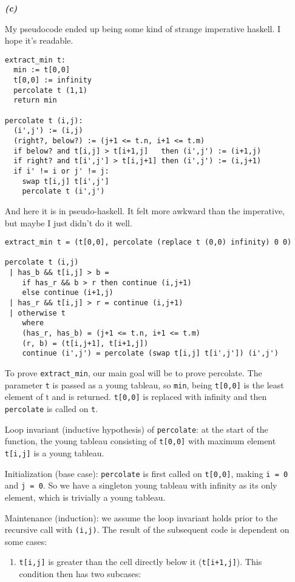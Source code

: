 \documentclass{article}
\begin{document}
\begin{enumerate}
\begin{enumerate}
		\item[\textbf{\emph{{(c)}}}]

My pseudocode ended up being some kind of strange imperative haskell. I hope
it's readable.

\begin{verbatim}
extract_min t:
  min := t[0,0]
  t[0,0] := infinity
  percolate t (1,1)
  return min

percolate t (i,j):
  (i',j') := (i,j)
  (right?, below?) := (j+1 <= t.n, i+1 <= t.m)
  if below? and t[i,j] > t[i+1,j]   then (i',j') := (i+1,j)
  if right? and t[i',j'] > t[i,j+1] then (i',j') := (i,j+1)
  if i' != i or j' != j:
    swap t[i,j] t[i',j']
    percolate t (i',j')
\end{verbatim}

And here it is in pseudo-haskell. It felt more awkward than the
imperative, but maybe I just didn't do it well.

\begin{minipage}{\linewidth}
\begin{verbatim}
extract_min t = (t[0,0], percolate (replace t (0,0) infinity) 0 0)

percolate t (i,j) 
 | has_b && t[i,j] > b =
    if has_r && b > r then continue (i,j+1)
    else continue (i+1,j)
 | has_r && t[i,j] > r = continue (i,j+1) 
 | otherwise t
    where
    (has_r, has_b) = (j+1 <= t.n, i+1 <= t.m)
    (r, b) = (t[i,j+1], t[i+1,j])
    continue (i',j') = percolate (swap t[i,j] t[i',j']) (i',j')

\end{verbatim}
\end{minipage}

To prove \texttt{extract\_min}, our main goal will be to prove percolate. The parameter
\texttt{t} is passed as a young tableau, so \texttt{min}, being \texttt{t[0,0]}
is the least element of t and is returned. \texttt{t[0,0]} is replaced with
infinity and then \texttt{percolate} is called on \texttt{t}.

Loop invariant (inductive hypothesis) of \texttt{percolate}: at the start of the function, the young tableau consisting of \texttt{t[0,0]} with maximum element \texttt{t[i,j]} is a young tableau.

Initialization (base case): \texttt{percolate} is first called on \texttt{t[0,0]}, making
\texttt{i = 0} and \texttt{j = 0}. So we have a singleton young tableau with
infinity as its only element, which is trivially a young tableau.

Maintenance (induction): we assume the loop invariant holds prior to the recursive call with \texttt{(i,j)}. The result of the subsequent code is dependent on some cases:
\begin{enumerate}
\item \texttt{t[i,j]} is greater than the cell directly below it (\texttt{t[i+1,j]}). This condition then has two subcases:


\end{enumerate}
\end{enumerate}
\end{enumerate}
\end{document}
